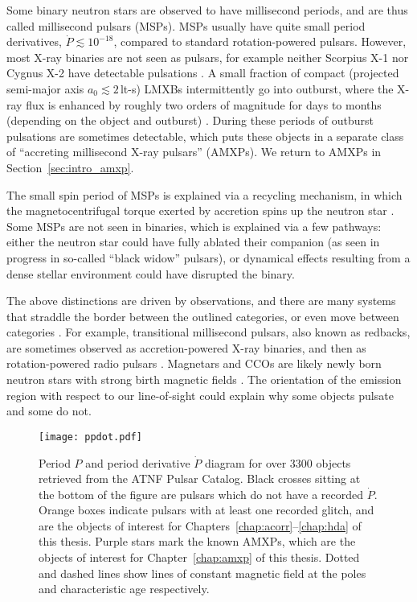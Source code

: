\begin{itemize}
    Some binary neutron stars are observed to have millisecond periods, and are thus called millisecond pulsars (MSPs). MSPs usually have quite small period derivatives, $\dot{P} \lesssim 10^{-18}$, compared to standard rotation-powered pulsars. However, most X-ray binaries are not seen as pulsars, for example neither Scorpius X-1 nor Cygnus X-2 have detectable pulsations \citep{Galaudage2022}. A small fraction of compact (projected semi-major axis $a_0 \lesssim 2\,$lt-s) LMXBs intermittently go into outburst, where the X-ray flux is enhanced by roughly two orders of magnitude for days to months (depending on the object and outburst) \citep{DiSalvo2022}. During these periods of outburst pulsations are sometimes detectable, which puts these objects in a separate class of ``accreting millisecond X-ray pulsars'' (AMXPs). We return to AMXPs in Section~\ref{sec:intro_amxp}.
    
    The small spin period of MSPs is explained via a recycling mechanism, in which the magnetocentrifugal torque exerted by accretion spins up the neutron star \citep{Ghosh1977,Ghosh1979a,Tauris2012}. Some MSPs are not seen in binaries, which is explained via a few pathways: either the neutron star could have fully ablated their companion (as seen in progress in so-called ``black widow'' pulsars), or dynamical effects resulting from a dense stellar environment could have disrupted the binary.
\end{itemize}

The above distinctions are driven by observations, and there are many systems that straddle the border between the outlined categories, or even move between categories \citep{Kaspi2010}. For example, transitional millisecond pulsars, also known as redbacks, are sometimes observed as accretion-powered X-ray binaries, and then as rotation-powered radio pulsars \citep{Campana2018}. Magnetars and CCOs are likely newly born neutron stars with strong birth magnetic fields \citep{Woods2006}. The orientation of the emission region with respect to our line-of-sight could explain why some objects pulsate and some do not.

\begin{figure}
    \centering
    \texttt{[image: ppdot.pdf]}
    \caption{Period $P$ and period derivative $\dot{P}$ diagram for over 3300 objects retrieved from the ATNF Pulsar Catalog. Black crosses sitting at the bottom of the figure are pulsars which do not have a recorded $\dot{P}$. Orange boxes indicate pulsars with at least one recorded glitch, and are the objects of interest for Chapters~\ref{chap:acorr}--\ref{chap:hda} of this thesis. Purple stars mark the known AMXPs, which are the objects of interest for Chapter~\ref{chap:amxp} of this thesis. Dotted and dashed lines show lines of constant magnetic field at the poles and characteristic age respectively. }
    \label{fig:intro_ppdot}
\end{figure}
    
